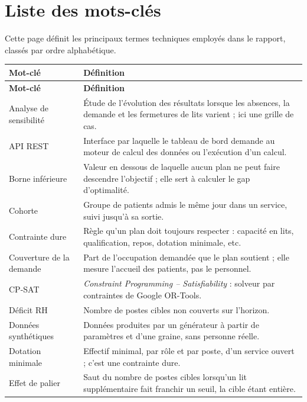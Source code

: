 \chapter*{Liste des mots-clés}

Cette page définit les principaux termes techniques employés dans le rapport, classés par ordre alphabétique.

\begingroup
\small
\renewcommand{\arraystretch}{1.25}
\begin{longtable}{>{\raggedright\arraybackslash}p{3.6cm} >{\raggedright\arraybackslash}p{11.4cm}}
\toprule
\textbf{Mot-clé} & \textbf{Définition} \\
\midrule
\endfirsthead
\toprule
\textbf{Mot-clé} & \textbf{Définition} \\
\midrule
\endhead
\bottomrule
\endfoot
Analyse de sensibilité & Étude de l'évolution des résultats lorsque les absences, la demande et les fermetures de lits varient ; ici une grille de \NbCas{} cas. \\
API REST & Interface par laquelle le tableau de bord demande au moteur de calcul des données ou l'exécution d'un calcul. \\
Borne inférieure & Valeur en dessous de laquelle aucun plan ne peut faire descendre l'objectif ; elle sert à calculer le gap d'optimalité. \\
Cohorte & Groupe de patients admis le même jour dans un service, suivi jusqu'à sa sortie. \\
Contrainte dure & Règle qu'un plan doit toujours respecter : capacité en lits, qualification, repos, dotation minimale, etc. \\
Couverture de la demande & Part de l'occupation demandée que le plan soutient ; elle mesure l'accueil des patients, pas le personnel. \\
CP-SAT & \textit{Constraint Programming -- Satisfiability} : solveur par contraintes de Google OR-Tools. \\
Déficit RH & Nombre de postes cibles non couverts sur l'horizon. \\
Données synthétiques & Données produites par un générateur à partir de paramètres et d'une graine, sans personne réelle. \\
Dotation minimale & Effectif minimal, par rôle et par poste, d'un service ouvert ; c'est une contrainte dure. \\
Effet de palier & Saut du nombre de postes cibles lorsqu'un lit supplémentaire fait franchir un seuil, la cible étant entière. \\

\end{longtable}
